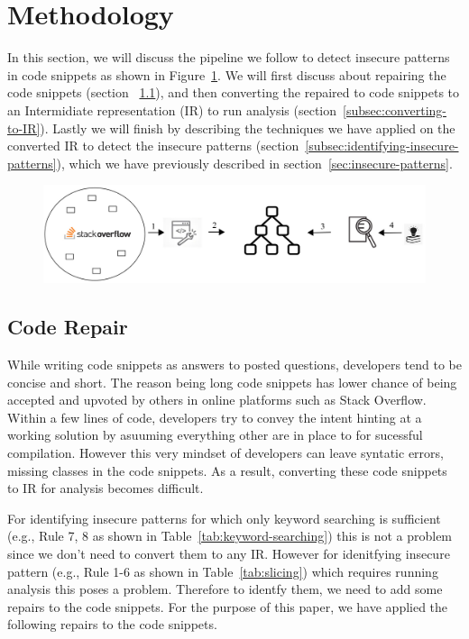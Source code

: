 \section{Methodology}
\label{sec:methodology}
In this section, we will discuss the pipeline we follow to detect insecure patterns in code snippets as shown in Figure~\ref{fig:pipeline}. We will first discuss about repairing the code snippets (section ~\ref{subsec:code-repair}), and then converting the repaired to code snippets to an Intermidiate representation (IR) to run analysis (section~\ref{subsec:converting-to-IR}). Lastly we will finish by describing the techniques we have applied on the converted IR to detect the insecure patterns (section~\ref{subsec:identifying-insecure-patterns}), which we have previously described in section~\ref{sec:insecure-patterns}.     
\begin{figure}[t]
  \centering
  \includegraphics*[width=\linewidth]{Figures/overall-process.png}
  \caption{}
  \label{fig:pipeline}
\end{figure}


\subsection{Code Repair}
\label{subsec:code-repair}
While writing code snippets as answers to posted questions, developers tend to be concise and short. The reason being long code snippets has lower chance of being accepted and upvoted by others in online platforms such as Stack Overflow. Within a few lines of code, developers try to convey the intent hinting at a working solution by asuuming everything other are in place to for sucessful compilation. However this very mindset of developers can leave syntatic errors, missing classes in the code snippets. As a result, converting these code snippets to IR for analysis becomes difficult.

For identifying insecure patterns for which only keyword searching is sufficient (e.g., Rule 7, 8 as shown in Table~\ref{tab:keyword-searching}) this is not a problem since we don't need to convert them to any IR. However for idenitfying insecure pattern (e.g., Rule 1-6 as shown in Table~\ref{tab:slicing}) which requires running analysis this poses a problem. Therefore to identfy them, we need to add some repairs to the code snippets. For the purpose of this paper, we have applied the following repairs to the code snippets.


